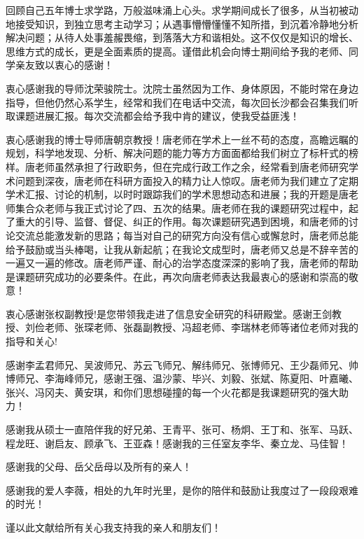 

\begin{ack}

回顾自己五年博士求学路，万般滋味涌上心头。求学期间成长了很多，从当初被动地接受知识，到独立思考主动学习；从遇事懵懵懂懂不知所措，到沉着冷静地分析解决问题；从待人处事羞赧畏缩，到落落大方和谐相处。这不仅仅是知识的增长、思维方式的成长，更是全面素质的提高。谨借此机会向博士期间给予我的老师、同学亲友致以衷心的感谢！

衷心感谢我的导师沈荣骏院士。沈院士虽然因为工作、身体原因，不能时常在身边指导，但他仍然心系学生，经常和我们在电话中交流，每次回长沙都会召集我们听取课题进展汇报。每次交流都会给予我中肯的建议，使我受益匪浅！

衷心感谢我的博士导师唐朝京教授！唐老师在学术上一丝不苟的态度，高瞻远瞩的规划，科学地发现、分析、解决问题的能力等方方面面都给我们树立了标杆式的榜样。唐老师虽然承担了行政职务，但在完成行政工作之余，经常看到唐老师研究学术问题到深夜，唐老师在科研方面投入的精力让人惊叹。唐老师为我们建立了定期学术汇报、讨论的机制，以时时跟踪我们的学术思想动态和进展；我的开题是唐老师集合众老师与我正式讨论了四、五次的结果。唐老师在我的课题研究过程中，起了重大的引导、监督、督促、纠正的作用。每次课题研究遇到困境，和唐老师的讨论交流总能激发新的思路；每当对自己的研究方向没有信心或懈怠时，唐老师总能给予鼓励或当头棒喝，让我从新起航；在我论文成型时，唐老师又总是不辞辛苦的一遍又一遍的修改。唐老师严谨、耐心的治学态度深深的影响了我，唐老师的帮助是课题研究成功的必要条件。在此，再次向唐老师表达我最衷心的感谢和崇高的敬意！
  
衷心感谢张权副教授!是您带领我走进了信息安全研究的科研殿堂。感谢王剑教授、刘俭老师、张琛老师、张磊副教授、冯超老师、李瑞林老师等诸位老师对我的指导和关心!
  
感谢李孟君师兄、吴波师兄、苏云飞师兄、解纬师兄、张博师兄、王少磊师兄、帅博师兄、李海峰师兄，感谢王强、温沙蒙、毕兴、刘毅、张斌、陈夏阳、叶嘉曦、张兴、冯冈夫、黄安琪，和你们思想碰撞的每一个火花都是我课题研究的强大助力！

感谢我从硕士一直陪伴我的好兄弟、王青平、张可、杨炯、王丁和、张军、马跃、程龙旺、谢启友、顾承飞、王亚森！感谢我的三任室友李华、秦立龙、马佳智！

感谢我的父母、岳父岳母以及所有的亲人！

感谢我的爱人李薇，相处的九年时光里，是你的陪伴和鼓励让我度过了一段段艰难的时光！
  
谨以此文献给所有关心我支持我的亲人和朋友们！

\end{ack}
